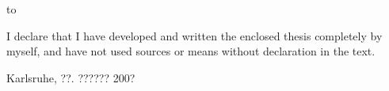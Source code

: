 \thispagestyle{empty}
\vspace*{42\baselineskip}
\hbox to \textwidth{\hrulefill}
\par
I declare that I have developed and written the enclosed thesis completely by myself, and
have not used sources or means without declaration in the text.

Karlsruhe, ??. ?????? 200?

\clearpage






